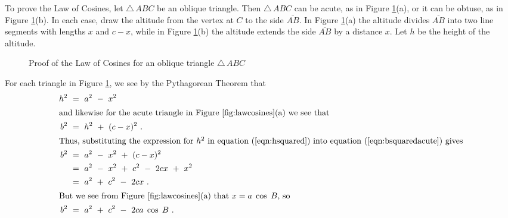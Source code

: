 To prove the Law of Cosines, let $\triangle\,ABC$ be an oblique triangle. Then $\triangle\,ABC$ can
be acute, as in Figure \ref{fig:lawcosines}(a), or it can be obtuse, as in Figure
\ref{fig:lawcosines}(b). In each case, draw the altitude from the vertex at $C$ to the side
$\overline{AB}$. In Figure \ref{fig:lawcosines}(a) the
altitude divides $\overline{AB}$ into two line segments with lengths $x$ and $c-x$, while in
Figure \ref{fig:lawcosines}(b) the altitude extends the side $\overline{AB}$ by a distance $x$.
Let $h$ be the height of the altitude.\vspace{-1mm}

\begin{figure}[h]
 \centering
 \qquad\qquad\qquad
 \caption[]{\quad Proof of the Law of Cosines for an oblique triangle $\triangle\,ABC$}
 \label{fig:lawcosines}
\end{figure}
For each triangle in Figure \ref{fig:lawcosines}, we see by the Pythagorean Theorem that
\begin{align}
 h^2 ~&=~ a^2 ~-~ x^2\label{eqn:hsquared}\\
 \intertext{and likewise for the acute triangle in Figure \ref{fig:lawcosines}(a) we see that}
 b^2 ~&=~ h^2 ~+~ (c-x)^2 ~.\label{eqn:bsquaredacute}\\
 \intertext{Thus, substituting the expression for $h^2$ in equation (\ref{eqn:hsquared}) into
 equation (\ref{eqn:bsquaredacute}) gives}
 b^2 ~&=~ a^2 ~-~ x^2 ~+~ (c-x)^2\notag\\
  &=~ a^2 ~-~ x^2 ~+~ c^2 ~-~ 2cx ~+~ x^2\notag\\
  &=~ a^2 ~+~ c^2 ~-~ 2cx ~.\notag\\
 \intertext{But we see from Figure \ref{fig:lawcosines}(a) that $x = a\;\cos\;B$, so}
 b^2 ~&=~ a^2 ~+~ c^2 ~-~ 2ca\;\cos\;B ~.
\end{align}
